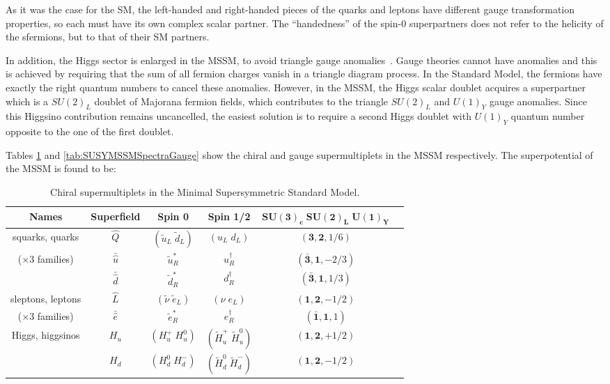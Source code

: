 As it was the case for the SM, the left-handed and right-handed pieces of the quarks and leptons have different gauge transformation properties, so each must have its own complex scalar partner.
The ``handedness'' of the spin-0 superpartners does not refer to the helicity of the sfermions, but to that of their SM partners.

In addition, the Higgs sector is enlarged in the MSSM, to avoid triangle gauge anomalies~\cite{Drees:1996ca}.
Gauge theories cannot have anomalies and this is achieved by requiring that the sum of all fermion charges vanish in a triangle diagram process.
In the Standard Model, the fermions have exactly the right quantum numbers to cancel these anomalies.
However, in the MSSM, the Higgs scalar doublet acquires a superpartner which is a $SU(2)_L$ doublet of Majorana fermion fields, which contributes to the triangle $SU(2)_L$ and $U(1)_Y$ gauge anomalies.
Since this Higgsino contribution remains uncancelled, the easiest solution is to require a second Higgs doublet with $U(1)_Y$ quantum number opposite to the one of the first doublet.

Tables \ref{tab:SUSYMSSMSpectraChiral} and \ref{tab:SUSYMSSMSpectraGauge} show the chiral and gauge supermultiplets in the MSSM respectively.
The superpotential of the MSSM is found to be:

\begin{table}[!ht]
\begin{center}
\begin{small}
\setlength{\tabcolsep}{0.0pc}
\begin{tabular*}{\textwidth}{@{\extracolsep{\fill}}cccccc}
\hline
\textbf{Names} & \textbf{Superfield} & \textbf{Spin 0} & \textbf{Spin 1/2} & $\mathbf{SU(3)_{c}\; SU(2)_{L}\; U(1)_{Y}}$ \\
\hline
squarks, quarks       & $\hat{Q}$ &  $(\tilde{u}_L\;\tilde{d}_L)$ & $(u_L\; d_L)$  & $(\mathbf{3}, \mathbf{2}, 1/6)$ \\
($\times 3$ families) & $\bar{\hat{u}}$ &  $\tilde{u}^\ast_R$     & $u^\dagger_R$  & $(\mathbf{\bar{3}}, \mathbf{1}, -2/3)$ \\
& $\bar{\hat{d}}$ &  $\tilde{d}^\ast_R$    & $d^\dagger_R$  & $(\mathbf{\bar{3}}, \mathbf{1}, 1/3)$ \\
\hline
sleptons, leptons     & $\hat{L}$ &  $(\tilde{\nu}\;\tilde{e}_L)$ & $(\nu\; e_L)$  & $(\mathbf{1}, \mathbf{2}, -1/2)$ \\
($\times 3$ families) & $\bar{\hat{e}}$ &  $\tilde{e}^\ast_R$     & $e^\dagger_R$  & $(\mathbf{\bar{1}}, \mathbf{1}, 1)$ \\
\hline
\multirow{2}{*}{Higgs, higgsinos} &  $H_u$ & $(H_u^+\; H_u^0)$ & $(\tilde{H}_u^+\; \tilde{H}_u^0)$ & $(\mathbf{1}, \mathbf{2}, +1/2)$ \\
&  $H_d$ & $(H_d^0\; H_d^-)$ & $(\tilde{H}_d^0\; \tilde{H}_d^-)$ & $(\mathbf{1}, \mathbf{2}, -1/2)$ \\
\hline
\end{tabular*}
\end{small}
\end{center}
\caption{Chiral supermultiplets in the Minimal Supersymmetric Standard Model.}
\label{tab:SUSYMSSMSpectraChiral}
\end{table}

